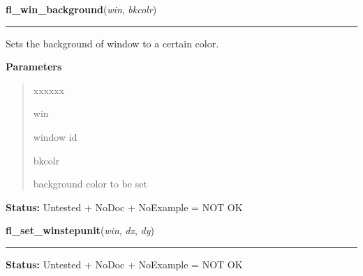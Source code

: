 \hspace{.8\funcindent}\begin{boxedminipage}{\funcwidth}

    \raggedright \textbf{fl\_win\_background}(\textit{win}, \textit{bkcolr})

    \vspace{-1.5ex}

    \rule{\textwidth}{0.5\fboxrule}
\setlength{\parskip}{2ex}
    Sets the background of window to a certain color.

\setlength{\parskip}{1ex}
      \textbf{Parameters}
      \vspace{-1ex}

      \begin{quote}
        \begin{Ventry}{xxxxxx}

          \item[win]

          window id

          \item[bkcolr]

          background color to be set

        \end{Ventry}

      \end{quote}

\textbf{Status:} Untested + NoDoc + NoExample = NOT OK



    \end{boxedminipage}

    \label{xformslib:library:fl_winstepsize}

    \vspace{0.5ex}

\hspace{.8\funcindent}\begin{boxedminipage}{\funcwidth}

    \raggedright \textbf{fl\_set\_winstepunit}(\textit{win}, \textit{dx}, \textit{dy})

    \vspace{-1.5ex}

    \rule{\textwidth}{0.5\fboxrule}
\setlength{\parskip}{2ex}
\setlength{\parskip}{1ex}
\textbf{Status:} Untested + NoDoc + NoExample = NOT OK



    \end{boxedminipage}

